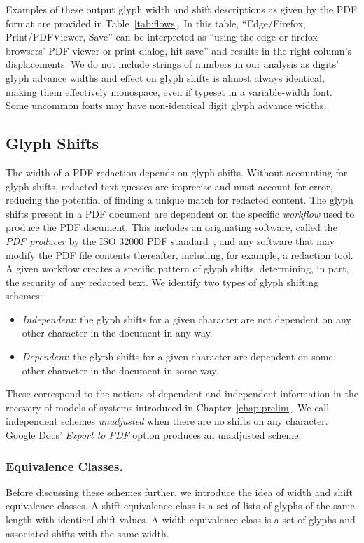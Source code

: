 Examples of these output glyph width and shift descriptions as given by the PDF format are provided in Table~\ref{tab:flows}.
In this table, ``Edge/Firefox, Print/PDFViewer, Save'' can be interpreted as ``using the edge or firefox browsers’ PDF viewer or print dialog, hit save'' and results in the right column's displacements.
We do not include strings of numbers in our analysis as digits' glyph advance widths and effect on glyph shifts is almost always identical, making them effectively monospace, even if typeset in a variable-width font. Some uncommon fonts may have non-identical digit glyph advance widths.

\subsection{Glyph Shifts}
\label{sec:schemes}

The width of a PDF redaction depends on glyph shifts.
Without accounting for glyph shifts, redacted text guesses are imprecise and must account for error, reducing the potential of finding a unique match for redacted content.
The glyph shifts present in a PDF document are dependent on the specific \emph{workflow} used to produce the PDF document.
This includes an originating software, called the \emph{PDF producer} by the ISO 32000 PDF standard~\cite{pdfTwo}, and any software that may modify the PDF file contents thereafter, including, for example, a redaction tool.
A given workflow creates a specific pattern of glyph shifts, determining, in part, the security of any redacted text.
We identify two types of glyph shifting schemes:

\begin{itemize}
    \item \emph{Independent}: the glyph shifts for a given character are not dependent on any other character in the document in any way.
    \item \emph{Dependent}: the glyph shifts for a given character are dependent on some other character in the document in some way.
\end{itemize}

These correspond to the notions of dependent and independent information in the recovery of models of systems introduced in Chapter~\ref{chap:prelim}.
We call independent schemes \emph{unadjusted} when there are no shifts on any character.
Google Docs' \emph{Export to PDF} option produces an unadjusted scheme.

\subsubsection{Equivalence Classes.} 
\label{sec:equiv-class}
Before discussing these schemes further, we introduce the idea of width and shift equivalence classes.
A shift equivalence class is a set of lists of glyphs of the same length with identical shift values.
A width equivalence class is a set of glyphs and associated shifts with the same width.

